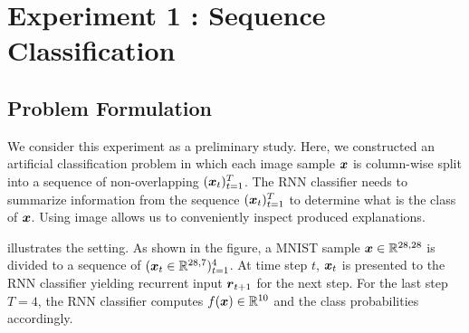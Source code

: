 

 

\section{Experiment 1 : Sequence Classification}
\label{sec:exp1}

\subsection{Problem Formulation}
We consider this experiment as a preliminary study. Here, we constructed an artificial classification problem in which each image sample $\boldsymbol{x}$ is column-wise split into a sequence of non-overlapping $(\boldsymbol{x}_t)_{t=1}^{T}$. The RNN classifier needs to summarize information from the sequence $(\boldsymbol{x}_t)_{t=1}^{T}$ to determine what is the class of $\boldsymbol{x}$.   Using image allows us to conveniently inspect produced explanations.

\addfigure{\ref{fig:artificial_problem}} illustrates the setting. As shown in the figure, a MNIST sample $ \patvector{x} \in \mathbb{R}^{28,28}$ is divided to a sequence of $( \patvector{x}_t \in   \mathbb{R}^{28,7} )_{t=1} ^ 4$. At time step $t$, $\patvector{x}_t$ is presented to the RNN classifier yielding recurrent input $\patvector{r}_{t+1}$ for the next step. For the last step $T = 4$, the RNN classifier computes $f(\boldsymbol{x}) \in \mathbb{R}^{10}$ and the class probabilities accordingly.


